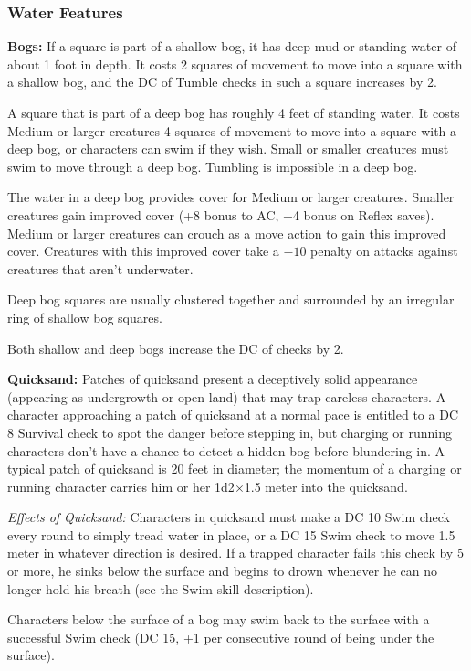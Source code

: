 \subsubsection{Water Features}
\textbf{Bogs:} If a square is part of a shallow bog, it has deep mud or standing water of about 1 foot in depth. It costs 2 squares of movement to move into a square with a shallow bog, and the DC of Tumble checks in such a square increases by 2.

A square that is part of a deep bog has roughly 4 feet of standing water. It costs Medium or larger creatures 4 squares of movement to move into a square with a deep bog, or characters can swim if they wish. Small or smaller creatures must swim to move through a deep bog. Tumbling is impossible in a deep bog.

The water in a deep bog provides cover for Medium or larger creatures. Smaller creatures gain improved cover (+8 bonus to AC, +4 bonus on Reflex saves). Medium or larger creatures can crouch as a move action to gain this improved cover. Creatures with this improved cover take a $-10$ penalty on attacks against creatures that aren't underwater.

Deep bog squares are usually clustered together and surrounded by an irregular ring of shallow bog squares.

Both shallow and deep bogs increase the DC of  checks by 2.

\textbf{Quicksand:} Patches of quicksand present a deceptively solid appearance (appearing as undergrowth or open land) that may trap careless characters. A character approaching a patch of quicksand at a normal pace is entitled to a DC 8 Survival check to spot the danger before stepping in, but charging or running characters don't have a chance to detect a hidden bog before blundering in. A typical patch of quicksand is 20 feet in diameter; the momentum of a charging or running character carries him or her 1d2$\times$1.5 meter into the quicksand.

\textit{Effects of Quicksand:} Characters in quicksand must make a DC 10 Swim check every round to simply tread water in place, or a DC 15 Swim check to move 1.5 meter in whatever direction is desired. If a trapped character fails this check by 5 or more, he sinks below the surface and begins to drown whenever he can no longer hold his breath (see the Swim skill description).

Characters below the surface of a bog may swim back to the surface with a successful Swim check (DC 15, +1 per consecutive round of being under the surface).

